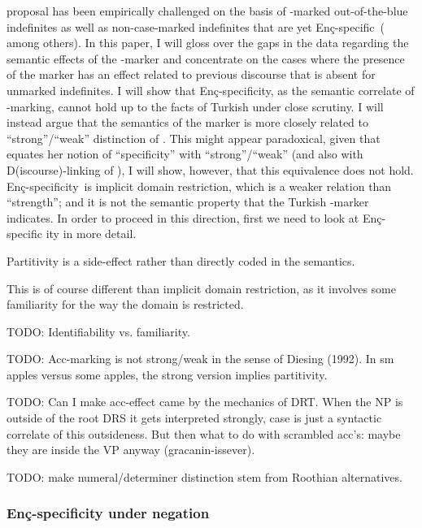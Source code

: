 \documentclass[11pt,a4paper]{article}
\newcommand{\encspec}{Enç-specific}
\begin{document}
 proposal has been empirically challenged on the basis of
\acc-marked out-of-the-blue indefinites as well as non-case-marked
indefinites that are yet \encspec\
(
among others).  In this paper, I will gloss over the gaps in the data
regarding the semantic effects of the \acc-marker and concentrate on
the cases where the presence of the marker has an effect related to
previous discourse that is absent for unmarked indefinites. I will
show that \encspec ity, as the semantic correlate of \acc-marking,
cannot hold up to the facts of Turkish under close scrutiny. I will
instead argue that the semantics of the marker is more closely related
to ``strong''/``weak'' distinction of \ctnm{milsark77}.  This might
appear paradoxical, given that \ctnm{enc91} equates her notion of
``specificity'' with ``strong''/``weak'' (and also with
D(iscourse)-linking of ), I will show, however, that
this equivalence does not hold.  \encspec ity\ is implicit domain
restriction, which is a weaker relation than ``strength''; and it is
not the semantic property that the Turkish \acc-marker indicates. In
order to proceed in this direction, first we need to look at \encspec
ity in more detail.

Partitivity is a side-effect rather than directly coded in the
semantics.

This is of course different than implicit domain restriction, as it
involves some familiarity for the way the domain is restricted.

TODO: Identifiability vs. familiarity.

TODO: Acc-marking is not strong/weak in the sense of Diesing (1992). In sm
apples versus some apples, the strong version implies partitivity.


TODO: Can I make acc-effect came by the mechanics of DRT. When the NP is
outside of the root DRS it gets interpreted strongly, case is just a
syntactic correlate of this outsideness. But then what to do with
scrambled acc's: maybe they are inside the VP anyway
(gracanin-issever).

TODO: make numeral/determiner distinction stem from Roothian
alternatives.

\subsubsection{\encspec ity under negation}
\end{document}
